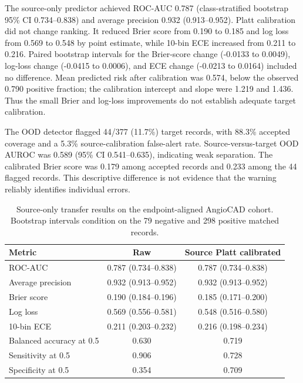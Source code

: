 \documentclass[12pt]{article}
\begin{document}
The source-only predictor achieved ROC-AUC 0.787 (class-stratified bootstrap
95\% CI 0.734--0.838) and average precision 0.932 (0.913--0.952). Platt
calibration did not change ranking. It reduced Brier score from 0.190 to 0.185
and log loss from 0.569 to 0.548 by point estimate, while 10-bin ECE increased
from 0.211 to 0.216. Paired bootstrap intervals for the Brier-score change
(-0.0133 to 0.0049), log-loss change (-0.0415 to 0.0006), and ECE change
(-0.0213 to 0.0164) included no difference. Mean predicted risk after
calibration was 0.574, below the observed 0.790 positive fraction; the
calibration intercept and slope were 1.219 and 1.436. Thus the small Brier and
log-loss improvements do not establish adequate target calibration.

The OOD detector flagged 44/377 (11.7\%) target records, with 88.3\% accepted
coverage and a 5.3\% source-calibration false-alert rate. Source-versus-target
OOD AUROC was 0.589 (95\% CI 0.541--0.635), indicating weak separation. The
calibrated Brier score was 0.179 among accepted records and 0.233 among the 44
flagged records. This descriptive difference is not evidence that the warning
reliably identifies individual errors.

\begin{table}[t]
\centering
\caption{Source-only transfer results on the endpoint-aligned AngioCAD cohort.
Bootstrap intervals condition on the 79 negative and 298 positive matched
records.}
\label{tab:angiocad-transfer}
\begin{tabular}{lcc}
\toprule
Metric & Raw & Source Platt calibrated \\
\midrule
ROC-AUC & 0.787 (0.734--0.838) & 0.787 (0.734--0.838) \\
Average precision & 0.932 (0.913--0.952) & 0.932 (0.913--0.952) \\
Brier score & 0.190 (0.184--0.196) & 0.185 (0.171--0.200) \\
Log loss & 0.569 (0.556--0.581) & 0.548 (0.516--0.580) \\
10-bin ECE & 0.211 (0.203--0.232) & 0.216 (0.198--0.234) \\
Balanced accuracy at 0.5 & 0.630 & 0.719 \\
Sensitivity at 0.5 & 0.906 & 0.728 \\
Specificity at 0.5 & 0.354 & 0.709 \\
\bottomrule
\end{tabular}
\end{table}
\end{document}
